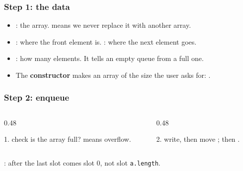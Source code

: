 \documentclass[aspectratio=169,10pt,compress]{beamer}
\begin{document}
\begin{frame}[t,fragile] \frametitle{Step 1: the data}
  \begin{itemize}\small
    \item {}: the array.  means we never replace it with another array.
    \item {}: where the front element is. : where the next element goes.
    \item {}: how many elements. It tells an empty queue from a full one.
    \item The \textbf{constructor} makes an array of the size the user asks for: .
  \end{itemize}
\end{frame}




\begin{frame}[t,fragile] \frametitle{Step 2: enqueue}
  \begin{columns}[T]
    \begin{column}{0.48\textwidth}
      \begin{block}{1. check}
        \small is the array full?  means overflow.
      \end{block}
    \end{column}
    \begin{column}{0.48\textwidth}
      \begin{block}{2. write, then move}
        \small {}; then .
      \end{block}
    \end{column}
  \end{columns}
  \small {}: after the last slot comes slot 0, not slot \texttt{a.length}.
\end{frame}
\end{document}
